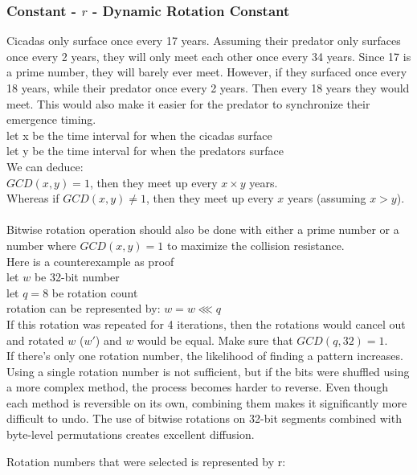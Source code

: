 \documentclass[11pt]{article}
\theoremstyle{definition}
\theoremstyle{remark}
\begin{document}
\subsubsection{Constant - $r$ - Dynamic Rotation Constant} \label{rotation_constant}

Cicadas only surface once every 17 years. Assuming their predator only surfaces once every 2 years, they will only meet each other once every 34 years. Since 17 is a prime number, they will barely ever meet. However, if they surfaced once every 18 years, while their predator once every 2 years. Then every 18 years they would meet. This would also make it easier for the predator to synchronize their emergence timing.\\
let x be the time interval for when the cicadas surface \\
let y be the time interval for when the predators surface \\
We can deduce:\\
$GCD(x,y) = 1$, then they meet up every $x \times y$ years. \\
Whereas if $GCD(x,y) \neq 1$, then they meet up every $x$ years (assuming $x > y$). \\
\\
Bitwise rotation operation should also be done with either a prime number or a number where $GCD(x,y) = 1$ to maximize the collision resistance.\\

Here is a counterexample as proof \\
let $w$ be 32-bit number\\
let $q = 8$ be rotation count\\
rotation can be represented by: $w = w \lll q$\\
If this rotation was repeated for 4 iterations, then the rotations would cancel out and rotated $w$ ($w'$) and $w$ would be equal. Make sure that $GCD(q, 32) = 1$. \\

If there's only one rotation number, the likelihood of finding a pattern increases. Using a single rotation number is not sufficient, but if the bits were shuffled using a more complex method, the process becomes harder to reverse. Even though each method is reversible on its own, combining them makes it significantly more difficult to undo. The use of bitwise rotations on 32-bit segments combined with byte-level permutations creates excellent diffusion.

Rotation numbers that were selected is represented by r:
\end{document}

